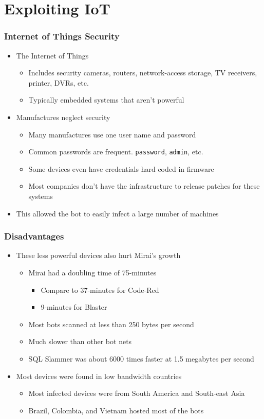 \documentclass{beamer}
\begin{document}
\section{Exploiting IoT}

\begin{frame}[fragile]
	\frametitle{Internet of Things Security}
	\begin{itemize}
		\item The Internet of Things
		\begin{itemize}
			\item Includes security cameras, routers, network-access storage, TV receivers, printer, DVRs, etc.
			\item Typically embedded systems that aren't powerful
		\end{itemize}
		\item Manufactures neglect security
		\begin{itemize}
			\item Many manufactures use one user name and password
			\item Common passwords are frequent. \verb|password|, \verb|admin|, etc.
			\item Some devices even have credentials hard coded in firmware
			\item Most companies don't have the infrastructure to release patches for these systems
		\end{itemize}
		\item This allowed the bot to easily infect a large number of machines
	\end{itemize}
\end{frame}

\begin{frame}
	\frametitle{Disadvantages}
	\begin{itemize}
		\item These less powerful devices also hurt Mirai's growth
		\begin{itemize}
			\item Mirai had a doubling time of 75-minutes
			\begin{itemize}
				\item Compare to 37-minutes for Code-Red
				\item 9-minutes for Blaster
			\end{itemize}
			\item Most bots scanned at less than 250 bytes per second
			\item Much slower than other bot nets
			\item SQL Slammer was about 6000 times faster at 1.5 megabytes per second
		\end{itemize}
		\item Most devices were found in low bandwidth countries
		\begin{itemize}
			\item Most infected devices were from South America and South-east Asia
			\item Brazil, Colombia, and Vietnam hosted most of the bots
		\end{itemize}
	\end{itemize}
\end{frame}
\end{document}
